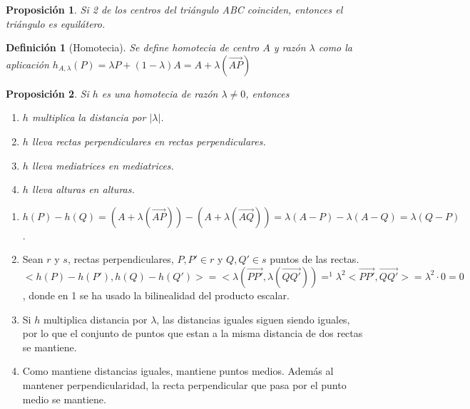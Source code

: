 \documentclass[11pt, a4paper, titlepage]{article}
\makeatletter
\renewenvironment{proof}[1][\proofname] {\vspace{-15pt}\par\pushQED{\qed}\normalfont\topsep6\p@\@plus6\p@\relax\trivlist\item[\hskip\labelsep\it#1\@addpunct{.}]\ignorespaces}{\popQED\endtrivlist\@endpefalse}
\renewcommand{\vec}{\overrightarrow}
\renewenvironment{proof}[1][\proofname] {\par\pushQED{\qed}\normalfont\topsep6\p@\@plus6\p@\relax\trivlist\item[\hskip\labelsep\itshape\sffamily#1\@addpunct{.}]\ignorespaces}{\popQED\endtrivlist\@endpefalse}
\theoremstyle{theorem-style}
\newtheorem{nprop}{Proposición}[section]
\theoremstyle{definition-style}
\newtheorem{ndef}{Definición}[section]
\theoremstyle{remark-style}
\theoremstyle{example-style}
\makeatother
\begin{document}
\begin{nprop}Si 2 de los centros del triángulo ABC coinciden, entonces el triángulo es equilátero.
\end{nprop}


\begin{ndef}[Homotecia]
  Se define homotecia de centro $A$ y razón $\lambda$ como la aplicación $h_{A,\lambda}(P) = \lambda P + (1-\lambda)A = A+\lambda(\vec{AP})$
\end{ndef}

\begin{nprop} Si $h$ es una homotecia de razón $\lambda\ne 0$, entonces 
\begin{enumerate}
\item $h$ multiplica la distancia por $|\lambda|$.
\item $h$ lleva rectas perpendiculares en rectas perpendiculares.
\item $h$ lleva mediatrices en mediatrices.
\item $h$ lleva alturas en alturas.
\end{enumerate}
\end{nprop}

\begin{proof}\hfill
\begin{enumerate}
	\item $h(P)-h(Q)=(A+\lambda(\vec{AP})) -(A+\lambda(\vec{AQ})) = \lambda(A-P) - \lambda(A-Q) = \lambda (Q-P)$.
	\item  Sean $r$ y $ s$, rectas perpendiculares, $P,P' \in r$ y $Q,Q'\in s$ puntos de las rectas. $<h(P) - h(P'),h(Q) - h(Q')> =  <\lambda (\vec{PP'}, \lambda(\vec {QQ'}))=^1 \lambda^2 <\vec{PP'},\vec{QQ'}> = \lambda^2 \cdot 0 = 0 $, donde en 1 se ha usado la bilinealidad del producto escalar.
	\item Si $h$ multiplica distancia por $\lambda$, las distancias iguales siguen siendo iguales, por lo que el conjunto de puntos que estan a la misma distancia de dos rectas se mantiene.
	\item Como mantiene distancias iguales, mantiene puntos medios. Además al mantener perpendicularidad, la recta perpendicular que pasa por el punto medio se mantiene.
\end{enumerate}
\end{proof}
\end{document}
